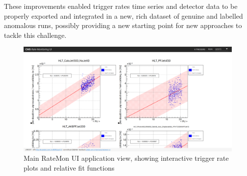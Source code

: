 \documentclass[a4, oneside, 11pt, nobib]{memoir}
\begin{document}
		These improvements enabled trigger rates time series and detector data to be properly exported and integrated in a new, rich dataset of genuine and labelled anomalous runs, possibly providing a new starting point for new approaches to tackle this challenge.

\begin{figure}[H]
    \centerline{
        \includegraphics[width=0.9\paperwidth]{figures/ratemon-ui0.png}}
    \caption{Main RateMon UI application view, showing interactive trigger rate plots and relative fit functions}
    \label{fig:ratemon_ui0}
\end{figure}
 
\printbibliography
\thispagestyle{empty}
\end{document}
